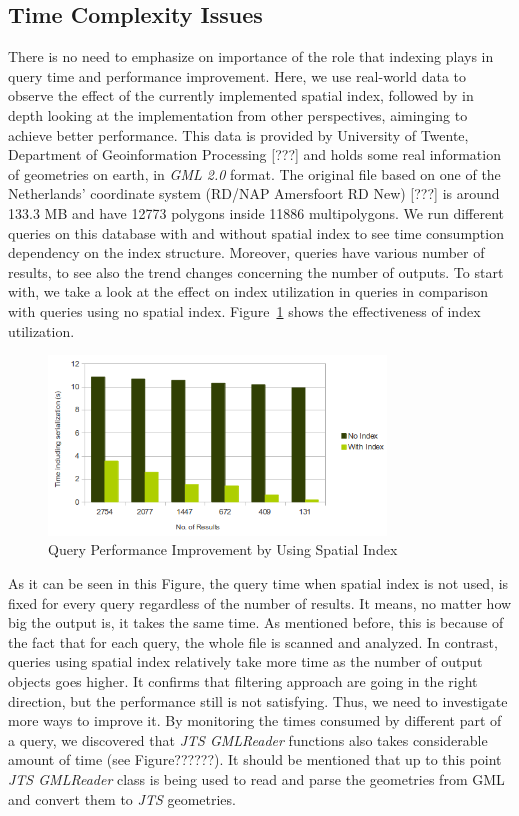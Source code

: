 \documentclass[a4paper,12pt]{article}
\begin{document}
\subsection{Time Complexity Issues}

There is no need to emphasize on importance of the role that indexing plays in query time and performance improvement. Here, we use real-world data to observe the effect of the currently implemented spatial index, followed by in depth looking at the implementation from other perspectives, aiminging to achieve better performance. This data is provided by University of Twente, Department of Geoinformation Processing [???] and holds some real information of geometries on earth, in \textit{GML 2.0} format. The original file based on one of the Netherlands' coordinate system (RD/NAP Amersfoort RD New) [???] is around 133.3 MB and have 12773 polygons inside 11886 multipolygons.
We run different queries on this database with and without spatial index to see time consumption dependency on the index structure. Moreover, queries have various number of results, to see also the trend changes concerning the number of outputs.
To start with, we take a look at the effect on index utilization in queries in comparison with queries using no spatial index. Figure~\ref{figIndexEfficiency} shows the effectiveness of index utilization.

 \begin{figure}
\centering
\includegraphics[width=0.8\textwidth]{IndexEfficiency}
\caption{Query Performance Improvement by Using Spatial Index}
\label{figIndexEfficiency}
\end{figure}

As it can be seen in this Figure, the query time when spatial index is not used, is fixed for every query regardless of the number of results. It means, no matter how big the output is, it takes the same time. As mentioned before, this is because of the fact that for each query, the whole file is scanned and analyzed. In contrast, queries using spatial index relatively take more time as the number of output objects goes higher. It confirms that filtering approach are going in the right direction, but the performance still is not satisfying. Thus, we need to investigate more ways to improve it.
By monitoring the times consumed by different part of a query, we discovered that \textit{JTS GMLReader} functions also takes considerable amount of time (see Figure??????). It should be mentioned that up to this point \textit{JTS GMLReader} class is being used to read and parse the geometries from GML and convert them to \textit{JTS} geometries.  
\end{document}
